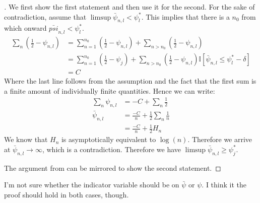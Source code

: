 \begin{proof}[]
    We first show the first statement and then use it for the second. For the
    sake of contradiction, assume that $\limsup \bar{\psi}_{n, l} <
    \psi_l^*$. This implies that there is a $n_0$ from which onward
    $\bar{psi}_{n, l} < \psi_l^*$.
    \begin{align}
      \sum_n (\frac{1}{2} - \psi_{n, l}) &= \sum_{n=1}^{n_0} (\frac{1}{2} -
            \psi_{n, l}) + \sum_{n > n_0} (\frac{1}{2} - \psi_{n, l}) \\
        &= \sum_{n=1}^{n_0} (\frac{1}{2} - \psi_j) + \sum_{n > n_0}
            (\frac{1}{2} - \psi_{n, l})\mathbb{I}[\bar{\psi}_{n, l} \leq
            \psi_l^* - \delta] \\
        &= C
    \end{align}
    Where the last line follows from the assumption and the fact that the first
    sum is a finite amount of individually finite quantities. Hence we can
    write:
    \begin{align}
      \sum_n \psi_{n, l} &= -C + \sum_n \frac{1}{2} \\
      \bar{\psi}_{n, l} &= \frac{-C}{n} + \frac{1}{2}\sum_n\frac{1}{n} \\
        &= \frac{-C}{n} + \frac{1}{2} H_n
    \end{align}
    We know that $H_n$ is asymptotically equivalent to $\log(n)$. Therefore we
    arrive at $\bar{\psi}_{n, l} \rightarrow \infty$, which is a contradiction.
    Therefore we have $\limsup \bar{\psi}_{n, l} \geq \psi_j^*$.

    The argument from  can be
    mirrored to show the second statement.
  \end{proof}

  \begin{remark}[Kevin 19/10/29]
    I'm not sure whether the indicator variable should be on $\bar{\psi}$ or
    $\psi$. I think it the proof should hold in both cases, though.
  \end{remark}

